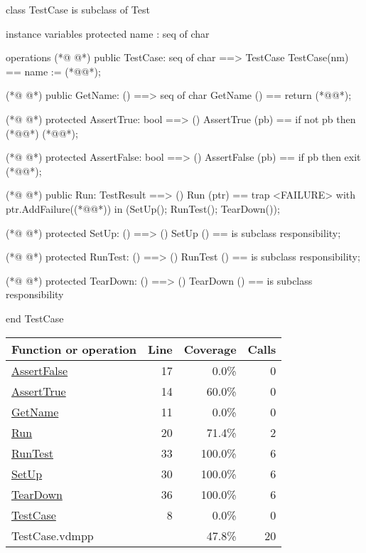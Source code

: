 \begin{vdmpp}[breaklines=true]
class TestCase
  is subclass of Test

instance variables
  protected name : seq of char

operations
(*@
\label{TestCase:8}
@*)
  public TestCase: seq of char ==> TestCase
  TestCase(nm) == name := (*@@*);

(*@
\label{GetName:11}
@*)
  public GetName: () ==> seq of char
  GetName () == return (*@@*);

(*@
\label{AssertTrue:14}
@*)
  protected AssertTrue: bool ==> ()
  AssertTrue (pb) == if not pb then (*@@*) (*@@*);

(*@
\label{AssertFalse:17}
@*)
  protected AssertFalse: bool ==> ()
  AssertFalse (pb) == if pb then exit (*@@*);

(*@
\label{Run:20}
@*)
  public Run: TestResult ==> ()
  Run (ptr) ==
    trap <FAILURE>
      with 
        ptr.AddFailure((*@@*))
      in
        (SetUp();
  RunTest();
  TearDown());

(*@
\label{SetUp:30}
@*)
  protected SetUp: () ==> ()
  SetUp () == is subclass responsibility;

(*@
\label{RunTest:33}
@*)
  protected RunTest: () ==> ()
  RunTest () == is subclass responsibility;

(*@
\label{TearDown:36}
@*)
  protected TearDown: () ==> ()
  TearDown () == is subclass responsibility

end TestCase
\end{vdmpp}
\bigskip
\begin{longtable}{|l|r|r|r|}
\hline
Function or operation & Line & Coverage & Calls \\
\hline
\hline
\hyperref[AssertFalse:17]{AssertFalse} & 17&0.0\% & 0 \\
\hline
\hyperref[AssertTrue:14]{AssertTrue} & 14&60.0\% & 0 \\
\hline
\hyperref[GetName:11]{GetName} & 11&0.0\% & 0 \\
\hline
\hyperref[Run:20]{Run} & 20&71.4\% & 2 \\
\hline
\hyperref[RunTest:33]{RunTest} & 33&100.0\% & 6 \\
\hline
\hyperref[SetUp:30]{SetUp} & 30&100.0\% & 6 \\
\hline
\hyperref[TearDown:36]{TearDown} & 36&100.0\% & 6 \\
\hline
\hyperref[TestCase:8]{TestCase} & 8&0.0\% & 0 \\
\hline
\hline
TestCase.vdmpp & & 47.8\% & 20 \\
\hline
\end{longtable}

